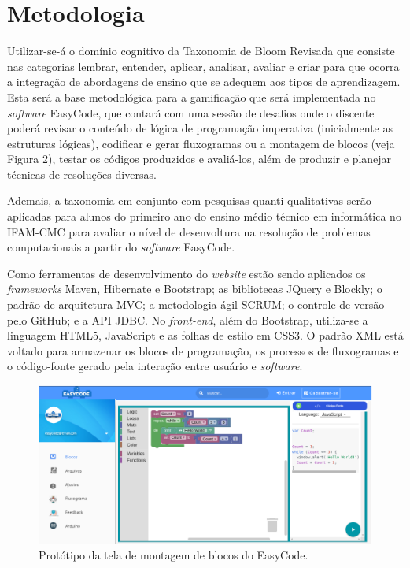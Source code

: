 \documentclass[12pt]{article}
\begin{document}
\section{Metodologia} 
Utilizar-se-á o domínio cognitivo da Taxonomia de Bloom Revisada que consiste nas categorias lembrar, entender, aplicar, analisar, avaliar e criar \cite{FERRAZ:2010} para que ocorra a integração de abordagens de ensino que se adequem aos tipos de aprendizagem. Esta será a base metodológica para a gamificação que será implementada no \textit{software} EasyCode, que contará com uma sessão de desafios onde o discente poderá revisar o conteúdo de lógica de programação imperativa (inicialmente as estruturas lógicas), codificar e gerar fluxogramas ou a montagem de blocos (veja Figura 2), testar os códigos produzidos e avaliá-los, além de produzir e planejar técnicas de resoluções diversas.
\par Ademais, a taxonomia em conjunto com pesquisas quanti-qualitativas serão aplicadas para alunos do primeiro ano do ensino médio técnico em informática no IFAM-CMC para avaliar o nível de desenvoltura na resolução de problemas computacionais a partir do \textit{software} EasyCode.
\par Como ferramentas de desenvolvimento do \textit{website} estão sendo aplicados os \textit{frameworks} Maven, Hibernate e Bootstrap; as bibliotecas JQuery e Blockly; o padrão de arquitetura MVC; a metodologia ágil SCRUM; o controle de versão pelo GitHub; e a API JDBC. No \textit{front-end}, além do Bootstrap, utiliza-se a linguagem HTML5, JavaScript e as folhas de estilo em CSS3. O padrão XML está voltado para armazenar os blocos de programação, os processos de fluxogramas e o código-fonte gerado pela interação entre usuário e \textit{software}. 

	\begin{figure}[h]
		\centering
		\includegraphics[scale=0.4]{bloc.png}
		\caption{Protótipo da tela de montagem de blocos do EasyCode.}
		\label{fig2}
	\end{figure}
\end{document}
